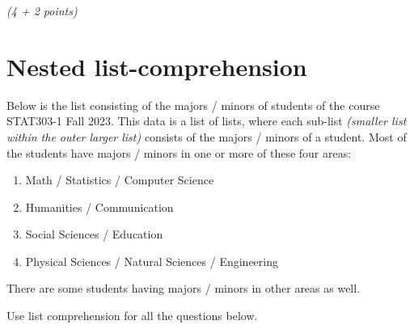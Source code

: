 \documentclass[
  letterpaper,
  DIV=11,
  numbers=noendperiod]{scrreprt}
\begin{document}
\emph{(4 + 2 points)}

\hypertarget{nested-list-comprehension}{%
\section{Nested list-comprehension}\label{nested-list-comprehension}}

Below is the list consisting of the majors / minors of students of the
course STAT303-1 Fall 2023. This data is a list of lists, where each
sub-list \emph{(smaller list within the outer larger list)} consists of
the majors / minors of a student. Most of the students have majors /
minors in one or more of these four areas:

\begin{enumerate}
\def\labelenumi{\arabic{enumi}.}
\item
  Math / Statistics / Computer Science
\item
  Humanities / Communication
\item
  Social Sciences / Education
\item
  Physical Sciences / Natural Sciences / Engineering
\end{enumerate}

There are some students having majors / minors in other areas as well.

Use list comprehension for all the questions below.
\end{document}
